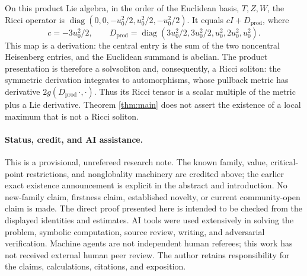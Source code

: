 \documentclass[11pt]{article}
\begin{document}
On this product Lie algebra, in the order of the Euclidean basis,
\(T,Z,W\), the Ricci operator is
\(\operatorname{diag}(0,0,-u_0^2/2,u_0^2/2,-u_0^2/2)\).
It equals \(cI+D_{\mathrm{prod}}\), where
\[
 c=-3u_0^2/2,\qquad
 D_{\mathrm{prod}}=
 \operatorname{diag}(3u_0^2/2,3u_0^2/2,u_0^2,2u_0^2,u_0^2).
\]
This map is a derivation: the central entry is the sum of the two
noncentral Heisenberg entries, and the Euclidean summand is abelian.
The product presentation is therefore a solvsoliton and, consequently,
a Ricci soliton: the symmetric derivation integrates to automorphisms,
whose pullback metric has derivative \(2g(D_{\mathrm{prod}}\,\cdot,\cdot)\).
Thus its Ricci tensor is a scalar multiple of the metric plus a Lie
derivative. Theorem \ref{thm:main} does not assert the existence of
a local maximum that is not a Ricci soliton.

\paragraph{Status, credit, and AI assistance.}
This is a provisional, unrefereed research note. The known family,
value, critical-point restrictions, and nonglobality machinery are
credited above; the earlier exact existence announcement is explicit
in the abstract and introduction. No new-family claim, firstness
claim, established novelty, or current community-open claim is made.
The direct proof presented here is intended to be checked from the
displayed identities and estimates.
AI tools were used extensively in solving the problem, symbolic
computation, source review, writing, and adversarial verification.
Machine agents are not independent human referees; this work has not
received external human peer review. The author retains responsibility
for the claims, calculations, citations, and exposition.
\end{document}

